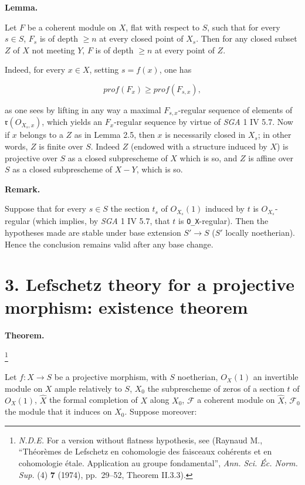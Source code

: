 \documentclass[
  11pt,
  a4paper,
]{book}
\begin{document}
\textbf{Lemma.}

Let \(F\) be a coherent module on \(X\), flat with respect to \(S\),
such that for every \(s \in S\), \(F_{s}\) is of depth \(\geqslant n\)
at every closed point of \(X_{s}\). Then for any closed subset \(Z\) of
\(X\) not meeting \(Y\), \(F\) is of depth \(\geqslant n\) at every
point of \(Z\).

Indeed, for every \(x \in X\), setting \(s = f(x)\), one has

\[ prof(F_{x}) \geqslant prof(F_{s,x}), \]

as one sees by lifting in any way a maximal \(F_{s,x}\)-regular sequence
of elements of \(\mathfrak{r}(O_{X_{s},x})\), which yields an
\(F_{x}\)-regular sequence by virtue of \emph{SGA} 1 IV 5.7. Now if
\(x\) belongs to a \(Z\) as in Lemma 2.5, then \(x\) is necessarily
closed in \(X_{s}\); in other words, \(Z\) is finite over \(S\). Indeed
\(Z\) (endowed with a structure induced by \(X\)) is projective over
\(S\) as a closed subprescheme of \(X\) which is so, and \(Z\) is affine
over \(S\) as a closed subprescheme of \(X - Y\), which is so.

\textbf{Remark.}

Suppose that for every \(s \in S\) the section \(t_{s}\) of
\(O_{X_{s}}(1)\) induced by \(t\) is \(O_{X_{s}}\)-regular (which
implies, by \emph{SGA} 1 IV 5.7, that \(t\) is \texttt{O\_X}-regular).
Then the hypotheses made are stable under base extension \(S' \to
S\) (\(S'\) locally noetherian). Hence the conclusion remains valid
after any base change.

\section{3. Lefschetz theory for a projective morphism: existence
theorem}\label{lefschetz-theory-for-a-projective-morphism-existence-theorem}

\textbf{Theorem.}

\footnote{\emph{N.D.E.} For a version without flatness hypothesis, see
  (Raynaud M., ``Théorèmes de Lefschetz en cohomologie des faisceaux
  cohérents et en cohomologie étale. Application au groupe
  fondamental'', \emph{Ann. Sci. Éc. Norm. Sup.} (4) \textbf{7} (1974),
  pp.~29--52, Theorem II.3.3).}

Let \(f: X \to S\) be a projective morphism, with \(S\) noetherian,
\(O_{X}(1)\) an invertible module on \(X\) ample relatively to \(S\),
\(X_{0}\) the subprescheme of zeros of a section \(t\) of \(O_{X}(1)\),
\(\hat{X}\) the formal completion of \(X\) along \(X_{0}\),
\(\mathcal{F}\) a coherent module on \(\hat{X}\), \(\mathcal{F}_{0}\)
the module that it induces on \(X_{0}\). Suppose moreover:
\end{document}

